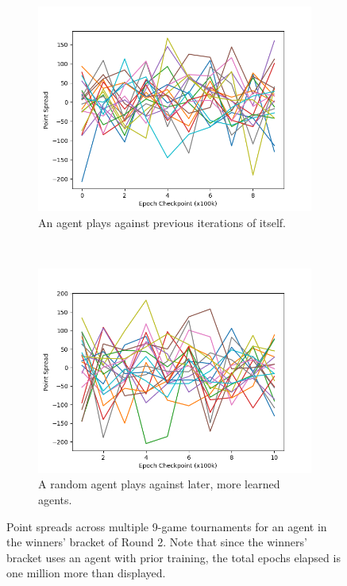 
\begin{figure}
\center

\begin{subfigure}[b]{0.45\textwidth}
	\includegraphics[width=\linewidth]{images/findings/round2/spreads_self-v-prev_winner.png}
	\caption{An agent plays against previous iterations of itself.}
	\label{fig:r2-spreads-winner-a}
\end{subfigure}
~
\begin{subfigure}[b]{0.45\textwidth}
	\includegraphics[width=\linewidth]{images/findings/round2/spreads_rand-v-fut_winner.png}
	\caption{A random agent plays against later, more learned agents.}
	\label{fig:r2-spreads-winner-b}
\end{subfigure}

\caption{
	Point spreads across multiple 9-game tournaments for an agent in the
	winners' bracket of Round 2.
	Note that since the winners' bracket uses an agent with prior training,
	the total epochs elapsed is one million more than displayed.
}
\label{fig:r2-spreads-winner}
\end{figure}
